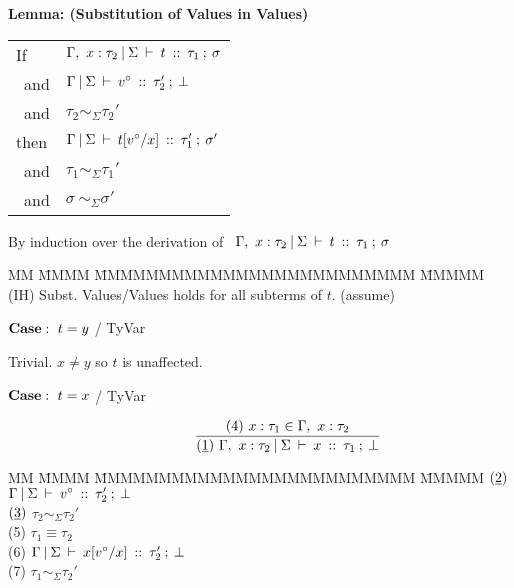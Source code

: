 
\clearpage{}
\begin{flushleft}
\textbf{Lemma: (Substitution of Values in Values)}

\begin{tabular}{ll}
	If  	&  $\Gamma, \ x : \tau_2 \: \arrowvert \: \Sigma \: \vdash \: t \: :: \: \tau_1 \: ; \: \sigma$ \\
	\ and  	&  $\Gamma \: \arrowvert \: \Sigma \: \vdash \: v^\circ \: :: \: \tau_2' \: ; \: \bot$ \\
	\ and 	&  $\tau_2 \sim_\Sigma \tau_2'$ \\[1ex]
	then 	&  $\Gamma \: \arrowvert \: \Sigma \: \vdash \: t[v^\circ/x] \: :: \: \tau_1' \: ; \: \sigma'$ \\
	\ and  	&  $\tau_1 \sim_\Sigma \tau_1'$ \\
	\ and  	&  $\sigma \: \sim_\Sigma \sigma'$ \\
\end{tabular}

\medskip
{} By induction over the derivation of \ $\Gamma, \ x : \tau_2 \: \arrowvert \: \Sigma \: \vdash \: t \: :: \: \tau_1 \: ; \: \sigma$

\medskip
\begin{tabbing}
MM \= MMMM \= MMMMMMMMMMMMMMMMMMMMMMMMM \= MMMMM  \kill
\>	(IH) 	\> Subst. Values/Values holds for all subterms of $t$.
		\> (assume)
\end{tabbing}

\medskip

$\textrm{\textbf{Case}}: \ t = y$ / TyVar

Trivial. $x \neq y$ so $t$ is unaffected.

\bigskip


$\textrm{\textbf{Case}}: \ t = x$ / TyVar

$$
\qq \qq
	\frac
	{ (4) \ x : \tau_1 \in \Gamma, \ x : \tau_2 }
	{ (\un{1}) \ 
	  \tyJudge
		{\Gamma, \ x : \tau_2}{\Sigma}
		{x}
		{\tau_1}
		{\bot}
	}
$$	

\begin{tabbing}
MM \= MMMM \= MMMMMMMMMMMMMMMMMMMMMMMMM \= MMMMM  \kill
\> 	$(\underline{2})$	\> $\Gamma \: \arrowvert \: \Sigma \: \vdash \: v^\circ \: :: \: \tau_2' \: ; \: \bot$ 
			\>  
\\[1ex]
\>	$(\underline{3})$	\> $\tau_2 \sim_\Sigma \tau_2'$
			\> \pby{assume}
\\[1ex]
\>	(5)		\> $\tau_1 \equiv \tau_2$
			\> 
\\[1ex]
\>	(6)		\> $\Gamma \: \arrowvert \: \Sigma \: \vdash \: x[v^\circ/x] \: :: \: \tau_2' \: ; \: \bot$
			\> 
\\[1ex]
\>	(7)		\> $\tau_1 \sim_\Sigma \tau_2'$
			\> 
\end{tabbing}
\bigskip



\end{flushleft}
